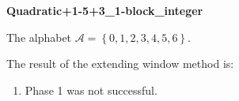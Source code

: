 \begin{exmp}
\textbf{ Quadratic+1-5+3\_1-block\_integer }

\label{ex:Quadratic+1-5+31-blockinteger}

The alphabet $\mathcal{A} =\left\{0, 1, 2, 3, 4, 5, 6\right\}$.

The result of the extending window method is:
\begin{enumerate}
    \item Phase 1 was not successful. 

\end{enumerate}
\end{exmp}
